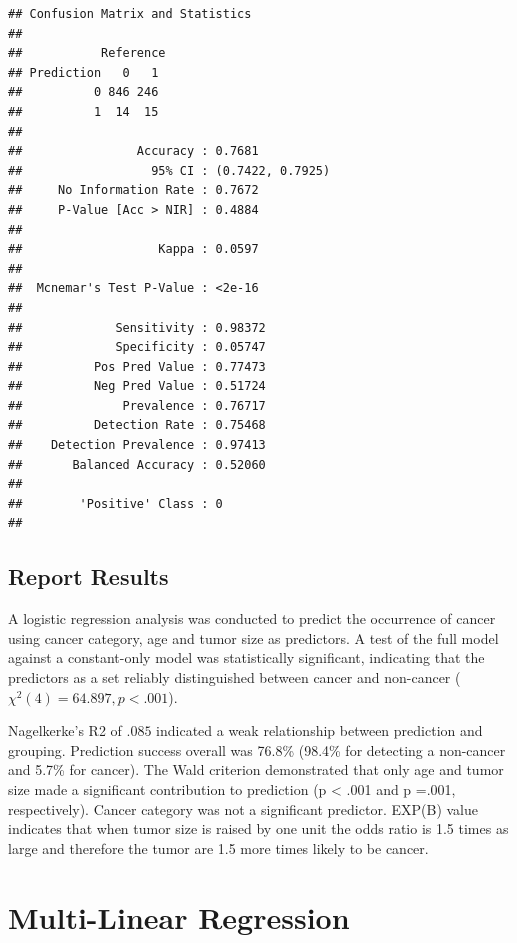 \documentclass[
]{ctexart}
\begin{document}
\begin{verbatim}
## Confusion Matrix and Statistics
## 
##           Reference
## Prediction   0   1
##          0 846 246
##          1  14  15
##                                           
##                Accuracy : 0.7681          
##                  95% CI : (0.7422, 0.7925)
##     No Information Rate : 0.7672          
##     P-Value [Acc > NIR] : 0.4884          
##                                           
##                   Kappa : 0.0597          
##                                           
##  Mcnemar's Test P-Value : <2e-16          
##                                           
##             Sensitivity : 0.98372         
##             Specificity : 0.05747         
##          Pos Pred Value : 0.77473         
##          Neg Pred Value : 0.51724         
##              Prevalence : 0.76717         
##          Detection Rate : 0.75468         
##    Detection Prevalence : 0.97413         
##       Balanced Accuracy : 0.52060         
##                                           
##        'Positive' Class : 0               
## 
\end{verbatim}

\hypertarget{report-results}{%
\subsection{Report Results}\label{report-results}}

A logistic regression analysis was conducted to predict the occurrence
of cancer using cancer category, age and tumor size as predictors. A
test of the full model against a constant-only model was statistically
significant, indicating that the predictors as a set reliably
distinguished between cancer and non-cancer
(\(χ^2(4)= 64.897, p < .001\)).

Nagelkerke's R2 of \(.085\) indicated a weak relationship between
prediction and grouping. Prediction success overall was 76.8\% (98.4\%
for detecting a non-cancer and 5.7\% for cancer). The Wald criterion
demonstrated that only age and tumor size made a significant
contribution to prediction (p \textless{} .001 and p =.001,
respectively). Cancer category was not a significant predictor. EXP(B)
value indicates that when tumor size is raised by one unit the odds
ratio is 1.5 times as large and therefore the tumor are 1.5 more times
likely to be cancer.

\hypertarget{multi-linear-regression}{%
\section{Multi-Linear Regression}\label{multi-linear-regression}}
\end{document}
